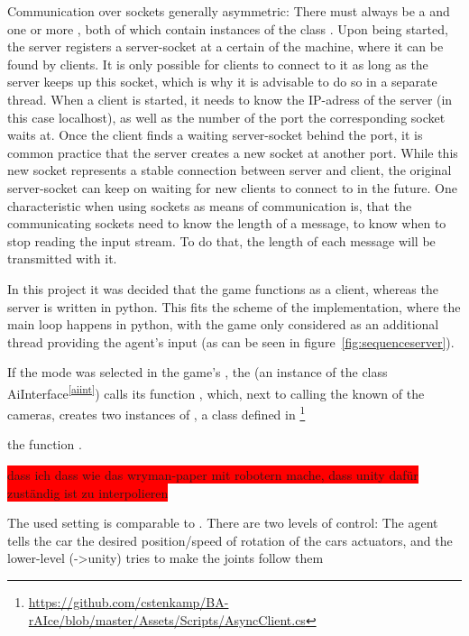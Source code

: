 Communication over sockets generally asymmetric: There must always be a  and one or more , both of which contain instances of the class . Upon being started, the server registers a server-socket at a certain  of the machine, where it can be found by clients. It is only possible for clients to connect to it as long as the server keeps up this socket, which is why it is advisable to do so in a separate thread. When a client is started, it needs to know the IP-adress of the server (in this case localhost), as well as the number of the port the corresponding socket waits at. Once the client finds a waiting server-socket behind the port, it is common practice that the server creates a new socket at another port. While this new socket represents a stable connection between server and client, the original server-socket can keep on waiting for new clients to connect to in the future. One characteristic when using sockets as means of communication is, that the communicating sockets need to know the length of a message, to know when to stop reading the input stream. To do that, the length of each message will be transmitted with it.

In this project it was decided that the game functions as a client, whereas the server is written in python. This fits the scheme of the implementation, where the main loop happens in python, with the game only considered as an additional thread providing the agent's input (as can be seen in figure~\ref{fig:sequenceserver}).

If the  mode was selected in the game's , the  (an instance of the class AiInterface\textsuperscript{\ref{aiint}}) calls 
its function , which, next to calling the known  of the cameras, creates two instances of , a class defined in \footnote{\url{https://github.com/cstenkamp/BA-rAIce/blob/master/Assets/Scripts/AsyncClient.cs}}

the function .

\colorbox{red}{dass ich dass wie das wryman-paper mit robotern mache, dass unity dafür zuständig ist zu interpolieren}

The used setting is comparable to \cite{wawrzynski_control_2015}. There are two levels of control: The agent tells the car the desired position/speed of rotation of the cars actuators, and the lower-level (->unity) tries to make the joints follow them

